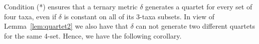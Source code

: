 \documentclass{article}
\newtheorem{lemma}{Lemma}
\begin{document}
 
%  
%  
%  

Condition (*) ensures that a ternary metric 
$\delta$ 
generates a quartet for every set of four taxa, even if $\delta$ is constant on all 
of its 3-taxa subsets. In view of Lemma~\ref{lem:quartet2} we also have that 
$\delta$ can not generate two different quartets for the same 4-set. Hence, 
we have the following corollary. 


 
%
%
%
%
%
\end{document}
